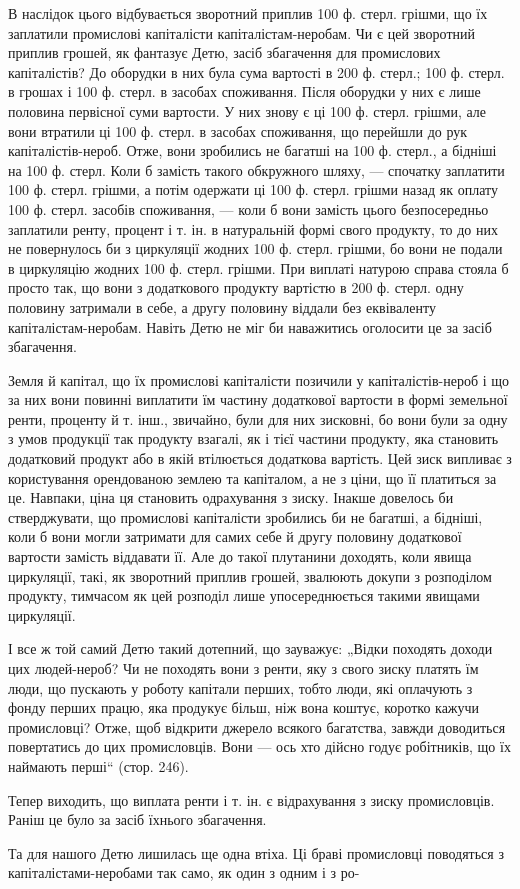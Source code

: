 В наслідок цього відбувається зворотний приплив 100 ф. стерл. грішми, що їх заплатили промислові
капіталісти капіталістам-неробам. Чи є цей зворотний приплив грошей, як фантазує Детю, засіб
збагачення для промислових капіталістів? До оборудки в них була сума вартості в 200 ф. стерл.; 100
ф. стерл. в грошах і 100 ф. стерл. в засобах споживання. Після оборудки у них є лише половина
первісної суми вартости. У них знову є ці 100 ф. стерл. грішми, але вони втратили ці 100 ф. стерл. в
засобах споживання, що перейшли до рук капіталістів-нероб. Отже, вони зробились не багатші на 100 ф.
стерл., а бідніші на 100 ф. стерл. Коли б замість такого обкружного шляху, — спочатку заплатити 100
ф. стерл. грішми, а потім одержати ці 100 ф. стерл. грішми назад як оплату 100 ф. стерл. засобів
споживання, — коли б вони замість цього безпосередньо заплатили ренту, процент і т. ін. в
натуральній формі свого продукту, то до них не повернулось би з циркуляції жодних 100 ф. стерл.
грішми, бо вони не подали в циркуляцію жодних 100 ф. стерл. грішми. При виплаті натурою справа
стояла б просто так, що вони з додаткового продукту вартістю в 200 ф. стерл. одну половину затримали
в себе, а другу половину віддали без еквіваленту капіталістам-неробам. Навіть Детю не міг би
наважитись оголосити це за засіб збагачення.

Земля й капітал, що їх промислові капіталісти позичили у капіталістів-нероб і що за них вони повинні
виплатити їм частину додаткової вартости в формі земельної ренти, проценту й т. інш., звичайно, були
для них зисковні, бо вони були за одну з умов продукції так продукту взагалі, як і тієї частини
продукту, яка становить додатковий продукт або в якій втілюється додаткова вартість. Цей зиск
випливає з користування орендованою землею та капіталом, а не з ціни, що її платиться за це.
Навпаки, ціна ця становить одрахування з зиску. Інакше довелось би стверджувати, що промислові
капіталісти зробились би не багатші, а бідніші, коли б вони могли затримати для самих себе й другу
половину додаткової вартости замість віддавати її. Але до такої плутанини доходять, коли явища
циркуляції, такі, як зворотний приплив грошей, звалюють докупи з розподілом продукту, тимчасом як
цей розподіл лише упосереднюється такими явищами циркуляції.

І все ж той самий Детю такий дотепний, що зауважує: „Відки походять доходи цих людей-нероб? Чи не
походять вони з ренти, яку з свого зиску платять їм люди, що пускають у роботу капітали перших,
тобто люди, які оплачують з фонду перших працю, яка продукує більш, ніж вона коштує, коротко кажучи
промисловці? Отже, щоб відкрити джерело всякого багатства, завжди доводиться повертатись до цих
промисловців. Вони — ось хто дійсно годує робітників, що їх наймають перші“ (стор. 246).

Тепер виходить, що виплата ренти і т. ін. є відрахування з зиску промисловців. Раніш це було за
засіб їхнього збагачення.

Та для нашого Детю лишилась ще одна втіха. Ці браві промисловці поводяться з капіталістами-неробами
так само, як один з одним і з ро-
